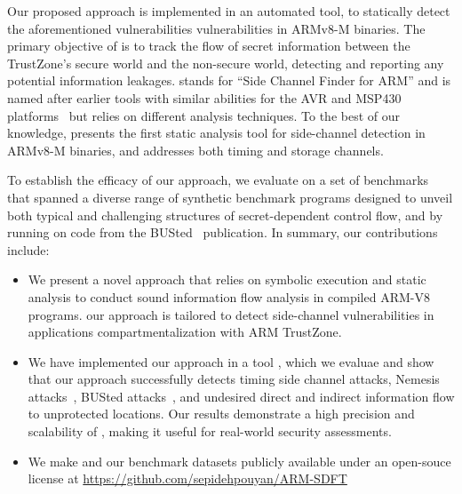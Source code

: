 Our proposed approach is implemented in an automated tool, \tool{} to
statically detect the aforementioned vulnerabilities vulnerabilities in
ARMv8-M binaries. The primary objective of \tool{} is to track the flow of
secret information between the TrustZone's secure world and the non-secure
world, detecting and reporting any potential information leakages. \tool{}
stands for ``Side Channel Finder for ARM'' and is named after earlier tools
with similar abilities for the AVR and MSP430 platforms~\cite{scfmsp,
MantelAVR} but relies on different analysis techniques.  To the best of our
knowledge, \tool{} presents the first static analysis tool for side-channel
detection in ARMv8-M binaries, and addresses both timing and storage
channels. 

To establish the efficacy of our approach, we evaluate \tool{} on a set of
benchmarks that spanned a diverse range of synthetic benchmark programs
designed to unveil both typical and challenging structures of
secret-dependent control flow,
%
%
and by running \tool{} on code from the BUSted~\cite{busted} publication.
In summary, our contributions include:

\begin{itemize}
%
  \item{We present a novel approach that relies on symbolic execution and
static analysis to conduct sound information flow analysis in compiled
ARM-V8 programs. our approach is tailored to detect side-channel
vulnerabilities in applications compartmentalization with ARM TrustZone.}
%
  \item{We have implemented our approach in a tool \tool{}, which we
evaluae and show that our approach successfully detects  timing side
channel attacks, Nemesis attacks~\cite{Nemesis}, BUSted
attacks~\cite{busted}, and undesired direct and indirect information flow
to unprotected locations. Our results demonstrate a high precision and
scalability of \tool{}, making it useful for real-world security
assessments.}
%
  \item{We make \tool{} and our benchmark datasets publicly available under
an open-souce license at
\href{https://github.com/sepidehpouyan/ARM-SDFT}{https://github.com/sepidehpouyan/ARM-SDFT}
%
 }
%
\end{itemize}

